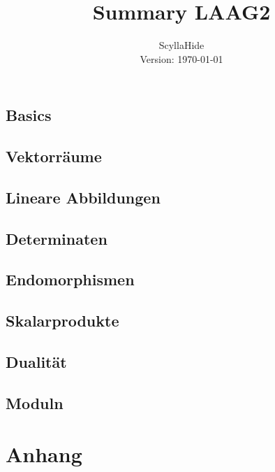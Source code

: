 \documentclass[ngerman,a4paper,order=firstname]{mathscript}
\title{\textbf{Summary LAAG2}}
\author{ScyllaHide \\Version: \today}
\begin{document}
\pagestyle{plain}

\maketitle

\hypertarget{tocpage}{}
\tableofcontents
{}

\pagebreak
{}
\pagestyle{fancy}

\chapter{Basics}


\chapter{Vektorräume}


\chapter{Lineare Abbildungen}


\chapter{Determinaten}


\chapter{Endomorphismen}


\chapter{Skalarprodukte}


\chapter{Dualität}


\chapter{Moduln}


\part*{Anhang}
\appendix


\printindex
\end{document}
